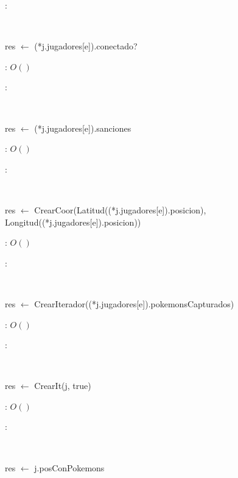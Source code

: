\begin{Algoritmos}
	\justifcomp:

	~

	\begin{algorithm}[H]
		\NoCaptionOfAlgo
		\caption{}
		res $\leftarrow$ (*j.jugadores[e]).conectado?\;
	\end{algorithm}

	\complejidad: $O()$

	\justifcomp:

	~

	\begin{algorithm}[H]
		\NoCaptionOfAlgo
		\caption{}
		res $\leftarrow$ (*j.jugadores[e]).sanciones\;
	\end{algorithm}

	\complejidad: $O()$

	\justifcomp:

	~

	\begin{algorithm}[H]
		\NoCaptionOfAlgo
		\caption{}
		res $\leftarrow$ CrearCoor(Latitud((*j.jugadores[e]).posicion), Longitud((*j.jugadores[e]).posicion))\;
	\end{algorithm}

	\complejidad: $O()$

	\justifcomp:

	~

	\begin{algorithm}[H]
		\NoCaptionOfAlgo
		\caption{}
		res $\leftarrow$ CrearIterador((*j.jugadores[e]).pokemonsCapturados)\;
	\end{algorithm}

	\complejidad: $O()$

	\justifcomp:

	~

	\begin{algorithm}[H]
		\NoCaptionOfAlgo
		\caption{}
		res $\leftarrow$ CrearIt(j, true)
	\end{algorithm}

	\complejidad: $O()$

	\justifcomp:

	~

	\begin{algorithm}[H]
		\NoCaptionOfAlgo
		\caption{}
		res $\leftarrow$ j.posConPokemons\;
	\end{algorithm}


\end{Algoritmos}
